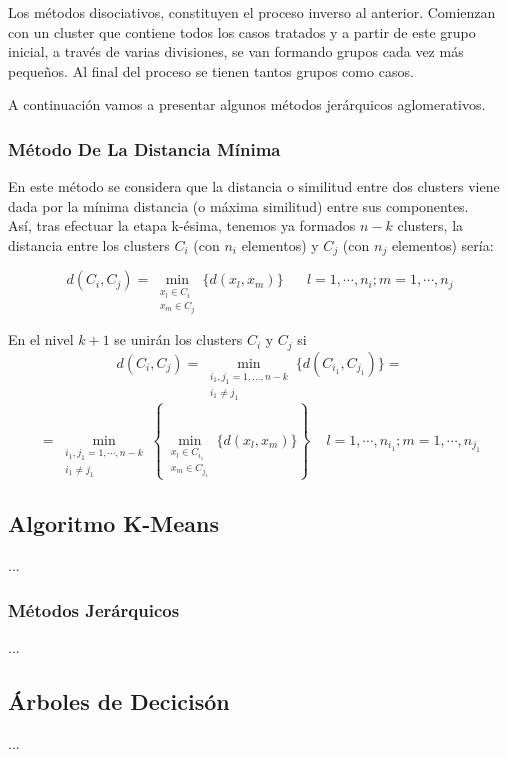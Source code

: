  Los métodos disociativos, constituyen el proceso inverso al anterior.  Comienzan con un cluster que contiene todos los casos tratados y a partir de este grupo inicial, a través de varias divisiones, se van formando grupos cada vez más pequeños.  Al final del proceso se tienen tantos grupos como casos. \par 

 A continuación vamos a presentar algunos métodos jerárquicos aglomerativos.
 
 \subsubsection*{Método De La Distancia Mínima}
 
 En este método se considera que la distancia o similitud entre dos clusters viene dada por la mínima distancia (o máxima similitud) entre sus componentes.
 \ \\
 Así, tras efectuar la etapa k-ésima, tenemos ya formados $n-k$ clusters, la distancia entre los clusters $C_{i}$ (con $n_{i}$ elementos) y $C_{j}$ (con $n_{j}$ elementos) sería:
 
$$d(C_{i},C_{j})= \min_{\substack {x_{l}\in C_{i}\\ x_{m}\in C_{j}}}\{d(x_{l},x_{m})\} \,\,\,\,\,\,\,\,\,\, l=1,\cdots,n_{i}; m=1,\cdots,n_{j}$$   
 
En el nivel $k+1$ se unirán los clusters $C_{i}$ y $C_{j}$ si	
$$d(C_{i},C_{j})= \min_{\substack {i_{1},j_{1}=1,...,n-k\\ i_{1}\neq j_{1}}} \{d(C_{i_{1}},C_{j_{1}})\}=$$
$$=\min_{\substack{i_{1},j_{1}=1,\cdots,n-k\\ i_{1}\neq j_{1}}} \left\{\min_{\substack{x_{l}\in C_{i_{1}}\\ x_{m}\in C_{j_{1}}}} \{d(x_{l},x_{m})\}\right\} \,\,\,\,\,\,\, l=1,\cdots,n_{i_{1}}; m=1,\cdots,n_{j_{1}}$$



\subsection{Algoritmo K-Means}

...

\subsubsection{Métodos Jerárquicos}

...


\subsection{Árboles de Decicisón}

...